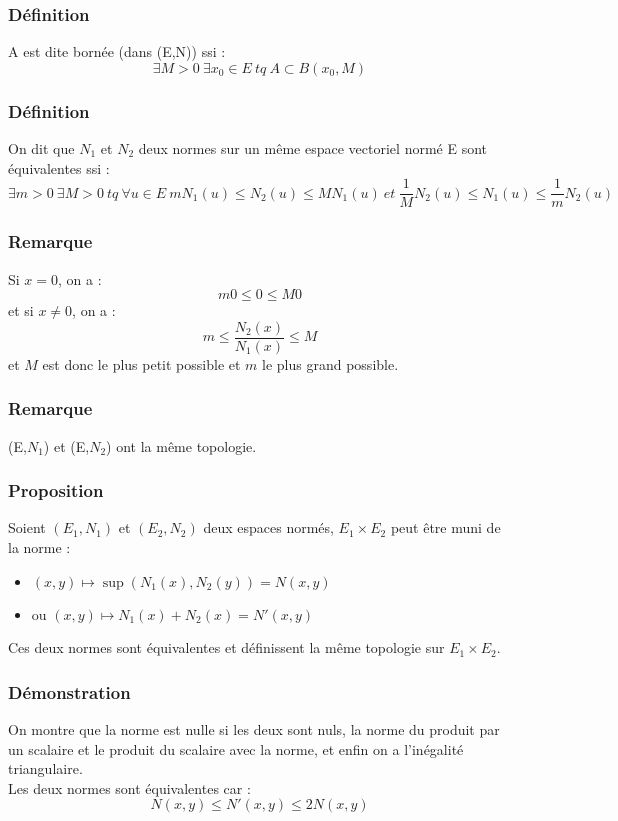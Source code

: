 \documentclass[a4paper, oneside]{report}
\newcommand{\x}{\times}
\newcommand{\evn}{espace vectoriel normé }
\newcommand{\fracun}[1]{\frac{1}{#1}}
\begin{document}
\subsubsection{Définition}
A est dite bornée (dans (E,N)) ssi :
$$\exists M>0~\exists x_0 \in E~tq~A\subset B(x_0,M)$$

\subsubsection{Définition}
On dit que $N_1$ et $N_2$ deux normes sur un même \evn E sont équivalentes ssi :
$$\exists m>0~ \exists M>0~tq~\forall u\in E~mN_1(u)\leq N_2(u)\leq MN_1(u)~et~\fracun{M}N_2(u)\leq N_1(u)\leq \fracun{m}N_2(u)$$

\subsubsection{Remarque}
Si $x=0$, on a :
$$m0\leq 0 \leq M0$$
et si $x\neq 0$, on a :
$$m \leq \frac{N_2(x)}{N_1(x)} \leq M$$
et $M$ est donc le plus petit possible et $m$ le plus grand possible.


\subsubsection{Remarque}
(E,$N_1$) et (E,$N_2$) ont la même topologie.

\subsubsection{Proposition}

Soient $(E_1,N_1)$ et $(E_2,N_2)$ deux espaces normés, $E_1 \x E_2$ peut être muni de la norme :
\begin{itemize}
\item $(x,y) \mapsto \sup (N_1(x), N_2(y))=N(x,y)$
\item ou $(x,y) \mapsto N_1(x)+N_2(x)=N'(x,y)$
\end{itemize}
Ces deux normes sont équivalentes et définissent la même topologie sur $E_1\x E_2$.

\subsubsection{Démonstration}

On montre que la norme est nulle si les deux sont nuls, la norme du produit par un scalaire et le produit du scalaire avec la norme, et enfin on a l'inégalité triangulaire.\\
Les deux normes sont équivalentes car :
$$N(x,y) \leq N'(x,y) \leq 2N(x,y)$$
\end{document}
